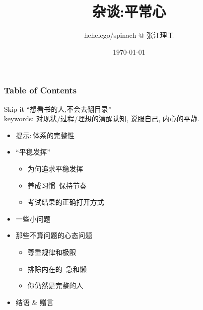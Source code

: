 \documentclass[10pt]{beamer}
\title{杂谈:平常心}
\author{hehelego/spinach @ 张江理工}
\date{\today}
\begin{document}
\begin{frame}
	\titlepage{}
\end{frame}

\begin{frame}
	\frametitle{Table of Contents}
	\begin{block}{Skip it}
		\noindent ``想看书的人,不会去翻目录''\\
		\noindent keywords: 对现状/过程/理想的清醒认知, 说服自己, 内心的平静.
	\end{block}
	\pause{}
	\begin{itemize}
		\item 提示:\,体系的完整性
		\item ``平稳发挥''
			\begin{itemize}
					\item 为何追求平稳发挥
					\item 养成习惯\ 保持节奏
					\item 考试结果的正确打开方式
			\end{itemize}
		\item 一些小问题
		\item 那些不算问题的心态问题
			\begin{itemize}
					\item 尊重规律和极限
					\item 排除内在的\ 急和懒
					\item 你仍然是完整的人
			\end{itemize}
		\item 结语 \& 赠言
	\end{itemize}
\end{frame}
\end{document}
